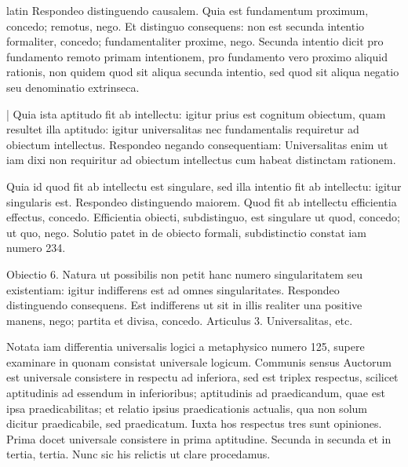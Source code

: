 \begin{otherlanguage*}{latin}
\pstart
  Respondeo distinguendo causalem. Quia est fundamentum proximum, concedo; remotus, nego. Et distinguo consequens: non est secunda intentio formaliter, concedo; fundamentaliter proxime, nego. Secunda intentio dicit pro fundamento remoto primam intentionem, pro fundamento vero proximo aliquid rationis, non quidem quod sit aliqua secunda intentio, sed quod sit aliqua negatio seu denominatio extrinseca. 
\pend

\pstart
  \textnormal{|} Quia ista aptitudo fit ab intellectu: igitur prius est  cognitum obiectum, quam resultet illa aptitudo: igitur universalitas nec fundamentalis requiretur ad obiectum intellectus. Respondeo negando consequentiam: Universalitas enim ut iam dixi non requiritur ad obiectum intellectus cum habeat distinctam rationem. 
\pend

\pstart
  Quia id quod fit ab intellectu est singulare, sed illa intentio fit ab intellectu: igitur singularis est. Respondeo distinguendo maiorem. Quod fit ab intellectu efficientia effectus, concedo. Efficientia obiecti, subdistinguo, est singulare ut quod, concedo; ut quo, nego. Solutio patet in  de obiecto formali, subdistinctio constat iam numero 234. 
\pend

\pstart
  Obiectio 6. Natura ut possibilis non petit hanc numero singularitatem seu existentiam: igitur indifferens est ad omnes singularitates. Respondeo distinguendo consequens. Est indifferens ut sit in illis realiter una positive manens, nego; partita et divisa, concedo. Articulus 3. Universalitas, etc. 
\pend

        \pstart
        \pend
      
\pstart
  Notata iam differentia universalis logici a metaphysico numero 125, supere examinare in quonam consistat universale logicum. Communis sensus Auctorum est universale consistere in respectu ad inferiora, sed est triplex respectus, scilicet aptitudinis ad essendum in inferioribus; aptitudinis ad praedicandum, quae est ipsa praedicabilitas; et relatio ipsius praedicationis actualis, qua non solum dicitur praedicabile, sed praedicatum. Iuxta hos respectus tres sunt opiniones. Prima docet universale consistere in prima aptitudine. Secunda in secunda et in tertia, tertia. Nunc sic his relictis ut clare procedamus. 
\pend


\end{otherlanguage*}
